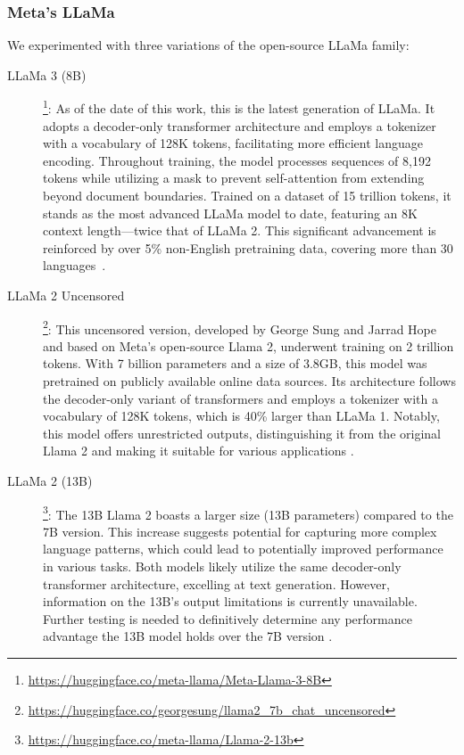 \subsubsection{Meta's LLaMa}

We experimented with three variations of the  open-source LLaMa family:

\begin{description}
\item[\hspace{=2em}LLaMa 3 (8B)]\footnote{\href{https://huggingface.co/meta-llama/Meta-Llama-3-8B}{https://huggingface.co/meta-llama/Meta-Llama-3-8B}}: As of the date of this work, this is the latest generation of LLaMa. It adopts a decoder-only transformer architecture and employs a tokenizer with a vocabulary of 128K tokens, facilitating more efficient language encoding. Throughout training, the model processes sequences of 8,192 tokens while utilizing a mask to prevent self-attention from extending beyond document boundaries. Trained on a dataset of 15 trillion tokens, it stands as the most advanced LLaMa model to date, featuring an 8K context length—twice that of LLaMa 2. This significant advancement is reinforced by over 5\% non-English pretraining data, covering more than 30 languages~\parencite{llama3}.    \item[\hspace{=2em}LLaMa 2 Uncensored]\footnote{\href{https://huggingface.co/georgesung/llama2_7b_chat_uncensored}{https://huggingface.co/georgesung/llama2\_7b\_chat\_uncensored}}: This uncensored version, developed by George Sung and Jarrad Hope and based on Meta's open-source Llama 2, underwent training on 2 trillion tokens. With 7 billion parameters and a size of 3.8GB, this model was pretrained on publicly available online data sources. Its architecture follows the decoder-only variant of transformers and employs a tokenizer with a vocabulary of 128K tokens, which is 40\% larger than LLaMa 1. Notably, this model offers unrestricted outputs, distinguishing it from the original Llama 2 and making it suitable for various applications \parencite{llama2}.
    \item[\hspace{=2em}LLaMa 2 (13B)]\footnote{\href{https://huggingface.co/meta-llama/Llama-2-13b}{https://huggingface.co/meta-llama/Llama-2-13b}}: The 13B Llama 2 boasts a larger size (13B parameters) compared to the 7B version. This increase suggests potential for capturing more complex language patterns, which could lead to potentially improved performance in various tasks. Both models likely utilize the same decoder-only transformer architecture, excelling at text generation. However, information on the 13B's output limitations is currently unavailable. Further testing  is needed to definitively determine any performance advantage the 13B model holds over the 7B version \parencite{llama2}.
\end{description}

